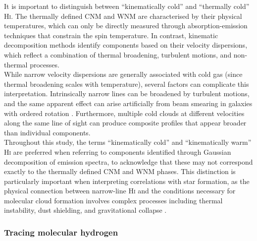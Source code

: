 It is important to distinguish between ``kinematically cold'' and ``thermally cold'' \textrm{H\textsc{i}}. The thermally defined CNM and WNM are characterised by their physical temperatures, which can only be directly measured through absorption-emission techniques that constrain the spin temperature. In contrast, kinematic decomposition methods identify components based on their velocity dispersions, which reflect a combination of thermal broadening, turbulent motions, and non-thermal processes.\\\indent
While narrow velocity dispersions are generally associated with cold gas (since thermal broadening scales with temperature), several factors can complicate this interpretation. Intrinsically narrow lines can be broadened by turbulent motions, and the same apparent effect can arise artificially from beam smearing in galaxies with ordered rotation \citep{Ianjamasimanana2012, Caldu-Primo2013, Stilp2013}. Furthermore, multiple cold clouds at different velocities along the same line of sight can produce composite profiles that appear broader than individual components.\\\indent
Throughout this study, the terms ``kinematically cold'' and ``kinematically warm'' \textrm{H\textsc{i}} are preferred when referring to components identified through Gaussian decomposition of emission spectra, to acknowledge that these may not correspond exactly to the thermally defined CNM and WNM phases. This distinction is particularly important when interpreting correlations with star formation, as the physical connection between narrow-line \textrm{H\textsc{i}} and the conditions necessary for molecular cloud formation involves complex processes including thermal instability, dust shielding, and gravitational collapse \citep{Schaye2004, Krumholtz2011, Klessen2016}.

\subsubsection{Tracing molecular hydrogen}


